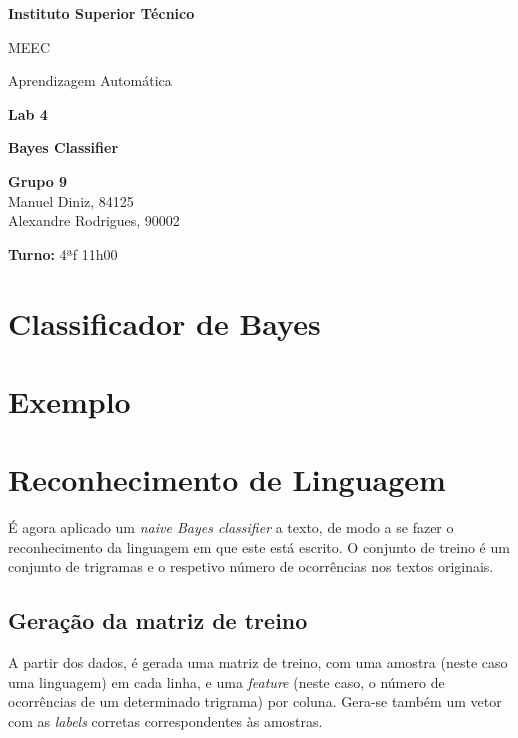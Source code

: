 \documentclass[a4paper,2pt]{report}
\begin{document}
\begin{titlepage}
    \begin{center}
        \vspace*{3cm}
 
        \LARGE
        \textbf{Instituto Superior Técnico}
        \vskip 0.4cm
 
        \Large{MEEC}
        \vskip 0.2cm

        \Large{Aprendizagem Automática}
        \vskip 3cm
        

 
        \Huge{\textbf{Lab 4}}
        \vskip 0.5cm

        \huge{\textbf{Bayes Classifier}}
        \vskip 0.5cm

 
        \vfill
 
        \large
        \textbf{Grupo 9}\\
        \vspace{0.3cm}
        Manuel Diniz, 84125\\
        Alexandre Rodrigues, 90002\\
        
        \vspace{1cm}

        \textbf{Turno:} 4ªf 11h00

    \end{center}
\end{titlepage}

\tableofcontents
\newpage

\chapter{Classificador de Bayes}

\chapter{Exemplo}

\chapter{Reconhecimento de Linguagem}

    \par É agora aplicado um \textit{naive Bayes classifier} a texto, de modo a se fazer o reconhecimento da linguagem em que este está escrito. O conjunto de treino é um conjunto de trigramas e o respetivo número de ocorrências nos textos originais.

    \section{Geração da matriz de treino}
        \par A partir dos dados, é gerada uma matriz de treino, com uma amostra (neste caso uma linguagem) em cada linha, e uma \textit{feature} (neste caso, o número de ocorrências de um determinado trigrama) por coluna. Gera-se também um vetor com as \textit{labels} corretas correspondentes às amostras.
\end{document}
